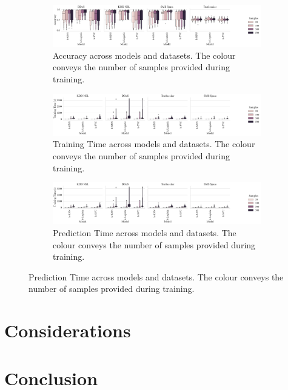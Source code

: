 \documentclass[sigconf]{acmart}
\begin{document}
\begin{figure}[t]
    \begin{subfigure}
        \centering
        \includegraphics[width=\textwidth]{figs/combined/models_vs_accuracy.pdf}
        \caption{Accuracy across models and datasets. The colour conveys the number of samples provided during training.}
        \label{acc_summary}
    \end{subfigure}
    \begin{subfigure}
        \centering
        \includegraphics[width=\textwidth]{figs/combined/models_vs_train_time.pdf}
        \caption{Training Time across models and datasets. The colour conveys the number of samples provided during training.}
        \label{train_time_summary}
    \end{subfigure}
    \begin{subfigure}
        \centering
        \includegraphics[width=\textwidth]{figs/combined/models_vs_train_time.pdf}
        \caption{Prediction Time across models and datasets. The colour conveys the number of samples provided during training.}
        \label{pred_time_summary}
    \end{subfigure}
    \label{fig:sample_summary}
\end{figure}


\section{Considerations}
\label{considerations}
\section{Conclusion}
\label{conclusion}



\clearpage

\end{document}
